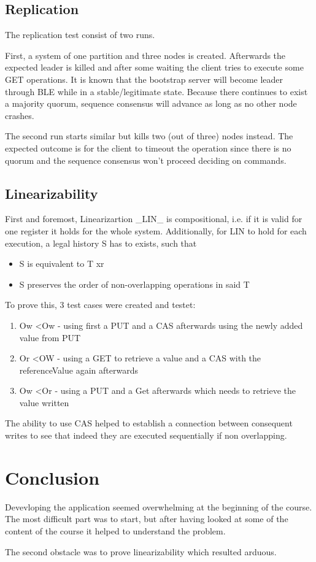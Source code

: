 \documentclass[a4paper]{scrartcl}
\begin{document}
\subsection{Replication}
The replication test consist of two runs.

First, a system of one partition and three nodes is created. 
Afterwards the expected leader is killed and after some waiting the client tries to execute some GET operations.
It is known that the bootstrap server will become leader through BLE while in a stable/legitimate state.
Because there continues to exist a majority quorum, sequence consensus will advance as long as no other node crashes.

The second run starts similar but kills two (out of three) nodes instead.
The expected outcome is for the client to timeout the operation since there is no quorum and the sequence consensus won't proceed deciding on commands.

\subsection{Linearizability}
First and foremost, Linearizartion _LIN_ is compositional, i.e. if it is valid for one register it holds for the whole system.
Additionally, for LIN to hold for each execution, a legal history S has to exists, such that
\begin{itemize}
\item S is equivalent to T \textbar xr
\item S preserves the order of non-overlapping operations in said T
\end{itemize}


To prove this, 3 test cases were created and testet:
\begin{enumerate}
\item Ow \textless Ow - using first a PUT and a CAS afterwards using the newly added value from PUT
\item Or \textless OW - using a GET to retrieve a value and a CAS with the referenceValue again afterwards
\item Ow \textless Or - using a PUT and a Get afterwards which needs to retrieve the value written
\end{enumerate}

The ability to use CAS helped to establish a connection between consequent writes to see that indeed they are executed sequentially if non overlapping.

\section{Conclusion}
Devevloping the application seemed overwhelming at the beginning of the course. 
The most difficult part was to start, but after having looked at some of the content of the course it helped to understand the problem.

The second obstacle was to prove linearizability which resulted arduous.
\end{document}
